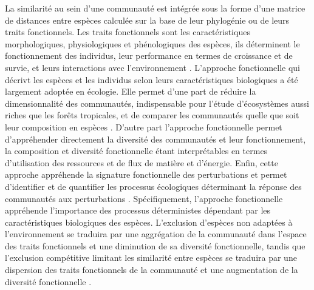 \documentclass[
  11pt,
  french,
  A4paper,
  extrafontsizes,onecolumn,openright
  ]{memoir}
\begin{document}
La similarité au sein d'une communauté est intégrée sous la forme d'une
matrice de distances entre espèces calculée sur la base de leur
phylogénie ou de leurs traits fonctionnels. Les traits fonctionnels sont
les caractéristiques morphologiques, physiologiques et phénologiques des
espèces, ils déterminent le fonctionnement des individus, leur
performance en termes de croissance et de survie, et leurs interactions
avec l'environnement \autocite{Violle2007b}. L'approche fonctionnelle
qui décrivt les espèces et les individus selon leurs caractéristiques
biologiques a été largement adoptée en écologie. Elle permet d'une part
de réduire la dimensionnalité des communautés, indispensable pour
l'étude d'écosystèmes aussi riches que les forêts tropicales, et de
comparer les communautés quelle que soit leur composition en espèces
\autocites{Begon2006}{Scheiter2013}{Mouillot2013a}{Sakschewski2016}.
D'autre part l'approche fonctionnelle permet d'appréhender directement
la diversité des communautés et leur fonctionnement, la composition et
diversité fonctionnelle étant interprétables en termes d'utilisation des
ressources et de flux de matière et d'énergie. Enfin, cette approche
appréhende la signature fonctionnelle des perturbations et permet
d'identifier et de quantifier les processus écologiques déterminant la
réponse des communautés aux perturbations \autocite{Funk2017}.
Spécifiquement, l'approche fonctionnelle appréhende l'importance des
processus déterministes dépendant par les caractéristiques biologiques
des espèces. L'exclusion d'espèces non adaptées à l'environnement se
traduira par une aggrégation de la communauté dans l'espace des traits
fonctionnels et une diminution de sa diversité fonctionnelle, tandis que
l'exclusion compétitive limitant les similarité entre espèces se
traduira par une dispersion des traits fonctionnels de la communauté et
une augmentation de la diversité fonctionnelle
\autocites{McGill2006}{Kunstler2012}.
\end{document}
